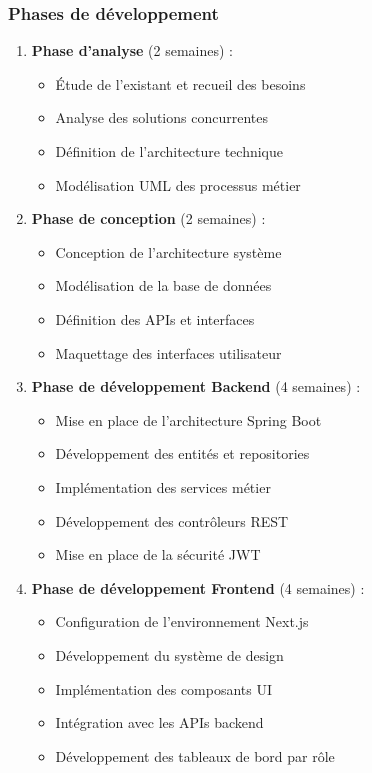 \documentclass[12pt,a4paper]{report}
\begin{document}
\subsubsection{Phases de développement}
\begin{enumerate}
\item \textbf{Phase d'analyse} (2 semaines) :
  \begin{itemize}
  \item Étude de l'existant et recueil des besoins
  \item Analyse des solutions concurrentes
  \item Définition de l'architecture technique
  \item Modélisation UML des processus métier
  \end{itemize}

\item \textbf{Phase de conception} (2 semaines) :
  \begin{itemize}
  \item Conception de l'architecture système
  \item Modélisation de la base de données
  \item Définition des APIs et interfaces
  \item Maquettage des interfaces utilisateur
  \end{itemize}

\item \textbf{Phase de développement Backend} (4 semaines) :
  \begin{itemize}
  \item Mise en place de l'architecture Spring Boot
  \item Développement des entités et repositories
  \item Implémentation des services métier
  \item Développement des contrôleurs REST
  \item Mise en place de la sécurité JWT
  \end{itemize}

\item \textbf{Phase de développement Frontend} (4 semaines) :
  \begin{itemize}
  \item Configuration de l'environnement Next.js
  \item Développement du système de design
  \item Implémentation des composants UI
  \item Intégration avec les APIs backend
  \item Développement des tableaux de bord par rôle
  \end{itemize}


\end{enumerate}
\end{document}
